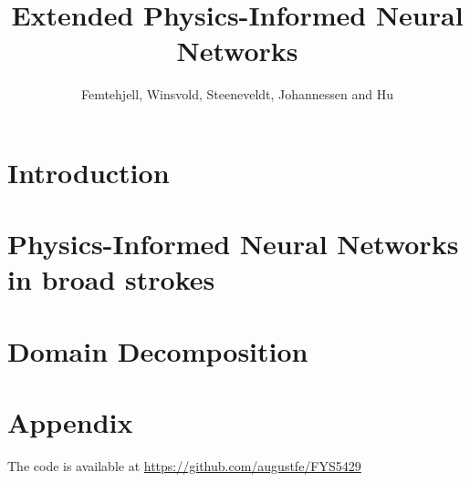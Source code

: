 \documentclass[aps,rmp,reprint,amsmath,amssymb,graphicx,longbibliography]{revtex4-1}
\begin{document}

\title{Extended Physics-Informed Neural Networks}

\author{Femtehjell, Winsvold, Steeneveldt, Johannessen and Hu}


\begin{abstract}
    \lipsum[1-1] 
\end{abstract}

\maketitle

\tableofcontents


\section{Introduction} 
\lipsum[2-4] \cite[p.~69--420]{Goodfellow2016}

\section{Physics-Informed Neural Networks in broad strokes}
\lipsum[5-6]

\section{Domain Decomposition}
\lipsum[6-7]


\section{Appendix}
The code is available at \url{https://github.com/augustfe/FYS5429}
\end{document}
